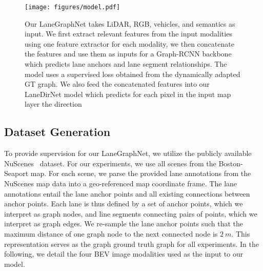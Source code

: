 \documentclass[letterpaper, 10 pt, conference]{ieeeconf}
\begin{document}
\begin{figure*}
\centering
\texttt{[image: figures/model.pdf]}
\caption{Our LaneGraphNet takes LiDAR, RGB, vehicles, and semantics as input. We first extract relevant features from the input modalities using one feature extractor for each modality, we then concatenate the features and use them as inputs for a Graph-RCNN backbone which predicts lane anchors and lane segment relationships. The model uses a supervised loss obtained from the dynamically adapted GT graph. We also feed the concatenated features into our LaneDirNet model which predicts for each pixel in the input map layer the direction}
\label{fig:approach}
\end{figure*}






\subsection{Dataset Generation}


To provide supervision for our LaneGraphNet, we utilize the publicly available NuScenes~\cite{caesar2020nuscenes} dataset. For our experiments, we use all scenes from the Boston-Seaport map. For each scene, we parse the provided lane annotations from the NuScenes map data into a geo-referenced map coordinate frame. The lane annotations entail the lane anchor points and all existing connections between anchor points. Each lane is thus defined by a set of anchor points, which we interpret as graph nodes, and line segments connecting pairs of points, which we interpret as graph edges. We re-sample the lane anchor points such that the maximum distance of one graph node to the next connected node is $\SI{2}{m}$. This representation serves as the graph ground truth graph for all experiments. In the following, we detail the four BEV image modalities used as the input to our model.
\end{document}
